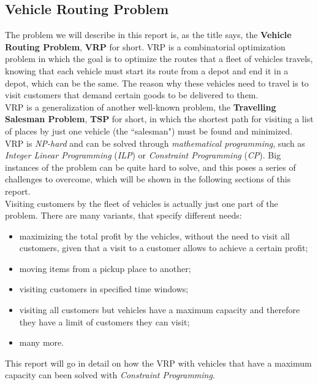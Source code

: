 \documentclass[../main.tex]{subfiles}
\begin{document}
\subsection{Vehicle Routing Problem}
The problem we will describe in this report is, as the title says, the \textbf{Vehicle Routing Problem}, \textbf{VRP} for short.
VRP is a combinatorial optimization problem in which the goal is to optimize the routes that a fleet of vehicles travels, knowing that each vehicle must start its route
from a depot and end it in a depot, which can be the same. The reason why these vehicles need to travel is to visit customers that demand certain goods to be delivered to them.\\
VRP is a generalization of another well-known problem, the \textbf{Travelling Salesman Problem}, \textbf{TSP} for short, in which the shortest path for visiting a list of places by just one vehicle (the ``salesman") must be found and minimized.
VRP is \textit{NP-hard} and can be solved through \textit{mathematical programming}, such as \textit{Integer Linear Programming} (\textit{ILP}) or \textit{Constraint Programming} (\textit{CP}).
Big instances of the problem can be quite hard to solve, and this poses a series of challenges to overcome, which will be shown in the following sections of this report.\\
Visiting customers by the fleet of vehicles is actually just one part of the problem. There are many variants, that specify different needs:
\begin{itemize}
    \item maximizing the total profit by the vehicles, without the need to visit all customers, given that a visit to a customer allows to achieve a certain profit;
    \item moving items from a pickup place to another;
    \item visiting customers in specified time windows;
    \item visiting all customers but vehicles have a maximum capacity and therefore they have a limit of customers they can visit;
    \item many more.
\end{itemize}
This report will go in detail on how the VRP with vehicles that have a maximum capacity can been solved with \textit{Constraint Programming}.
\end{document}
